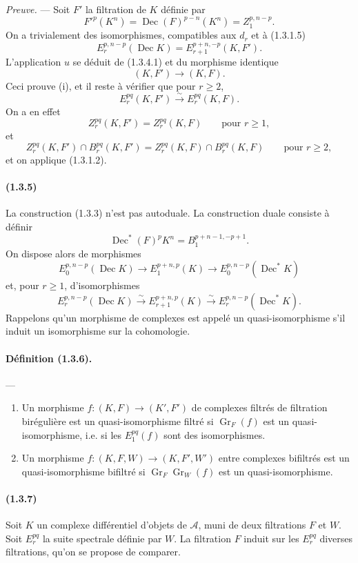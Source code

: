 \documentclass[10pt]{article}
\newcommand{\Gr}{\operatorname{Gr}}
\newcommand{\calA}{\mathcal A}
\newcommand{\iso}{\xrightarrow{\sim}}
\newcommand{\Dec}{\operatorname{Dec}}
\begin{document}
\emph{Preuve.} --- Soit $F'$ la filtration de $K$ définie par
\[
F'^p(K^n)=\Dec(F)^{p-n}(K^n)=Z_1^{p,n-p}.
\]
On a trivialement des isomorphismes, compatibles aux $d_r$ et à (1.3.1.5)
\[
\tag{1.3.4.1}
E_r^{p,n-p}(\Dec K)=E_{r+1}^{p+n,-p}(K,F').
\]
L'application $u$ se déduit de (1.3.4.1) et du morphisme identique
\[
(K,F')\longrightarrow(K,F).
\]
Ceci prouve (i), et il reste à vérifier que pour $r\ge2$,
\[
E_r^{pq}(K,F')\iso E_r^{pq}(K,F).
\]
On a en effet
\[
Z_r^{pq}(K,F')=Z_r^{pq}(K,F)\qquad\text{pour }r\ge1,
\]
et
\[
Z_r^{pq}(K,F')\cap B_r^{pq}(K,F')=Z_r^{pq}(K,F)\cap B_r^{pq}(K,F)\qquad\text{pour }r\ge2,
\]
et on applique (1.3.1.2).

\paragraph{(1.3.5)} La construction (1.3.3) n'est pas autoduale. La construction duale consiste à définir
\[
\Dec^*(F)^pK^n=B_1^{p+n-1,-p+1}.
\]
On dispose alors de morphismes
\[
E_0^{p,n-p}(\Dec K)\longrightarrow E_1^{p+n,p}(K)\longrightarrow E_0^{p,n-p}(\Dec^*K)
\]
et, pour $r\ge1$, d'isomorphismes
\[
E_r^{p,n-p}(\Dec K)\iso E_{r+1}^{p+n,p}(K)\iso E_r^{p,n-p}(\Dec^*K).
\]
Rappelons qu'un morphisme de complexes est appelé un quasi-isomorphisme s'il induit un isomorphisme sur la cohomologie.

\paragraph{Définition (1.3.6).} ---
\begin{enumerate}[label=(\roman*)]
\item Un morphisme $f:(K,F)\to(K',F')$ de complexes filtrés de filtration birégulière est un quasi-isomorphisme filtré si $\Gr_F(f)$ est un quasi-isomorphisme, i.e. si les $E_1^{pq}(f)$ sont des isomorphismes.
\item Un morphisme $f:(K,F,W)\to(K,F',W')$ entre complexes bifiltrés est un quasi-isomorphisme bifiltré si $\Gr_F\Gr_W(f)$ est un quasi-isomorphisme.
\end{enumerate}

\paragraph{(1.3.7)} Soit $K$ un complexe différentiel d'objets de $\calA$, muni de deux filtrations $F$ et $W$. Soit $E_r^{pq}$ la suite spectrale définie par $W$. La filtration $F$ induit sur les $E_r^{pq}$ diverses filtrations, qu'on se propose de comparer.
\end{document}
